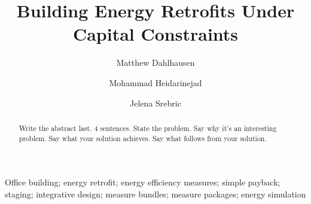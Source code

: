 \documentclass[review]{elsarticle}
\begin{document}
\begin{frontmatter}

\title{Building Energy Retrofits Under Capital Constraints}

\author{Matthew Dahlhausen}
\author{Mohammad Heidarinejad}
\author{Jelena Srebric}
\address{University of Maryland}




\begin{abstract}
Write the abstract last.  4 sentences.  State the problem. Say why it's an interesting problem.  Say what your solution achieves.  Say what follows from your solution.  
\end{abstract}

\begin{keyword}
Office building; energy retrofit; energy efficiency measures; simple payback; staging; integrative design; measure bundles; measure packages; energy simulation 
\end{keyword}

\end{frontmatter}

\linenumbers
\end{document}
